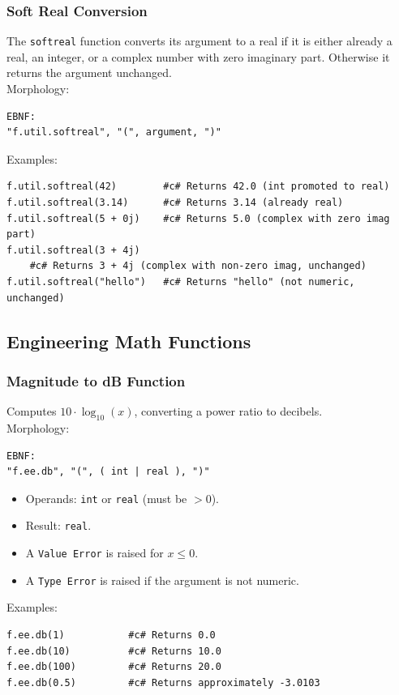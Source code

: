 \subsubsection{Soft Real Conversion}
The \texttt{softreal} function converts its argument to a real if it is either already a real, an integer, or a complex number with zero imaginary part. Otherwise it returns the argument unchanged. \\
Morphology:
\begin{verbatim}
EBNF:
"f.util.softreal", "(", argument, ")"
\end{verbatim}
Examples:
\begin{verbatim}
f.util.softreal(42)        #c# Returns 42.0 (int promoted to real)
f.util.softreal(3.14)      #c# Returns 3.14 (already real)
f.util.softreal(5 + 0j)    #c# Returns 5.0 (complex with zero imag part)
f.util.softreal(3 + 4j)
    #c# Returns 3 + 4j (complex with non-zero imag, unchanged)
f.util.softreal("hello")   #c# Returns "hello" (not numeric, unchanged)
\end{verbatim}

\subsection{Engineering Math Functions}

\subsubsection{Magnitude to dB Function}
Computes $10 \cdot \log_{10}(x)$, converting a power ratio to decibels. \\
Morphology:
\begin{verbatim}
EBNF:
"f.ee.db", "(", ( int | real ), ")"
\end{verbatim}
\begin{itemize}
\item Operands: \texttt{int} or \texttt{real} (must be $> 0$).
\item Result: \texttt{real}.
\item A \texttt{Value Error} is raised for $x \leq 0$.
\item A \texttt{Type Error} is raised if the argument is not numeric.
\end{itemize}
Examples:
\begin{verbatim}
f.ee.db(1)           #c# Returns 0.0
f.ee.db(10)          #c# Returns 10.0
f.ee.db(100)         #c# Returns 20.0
f.ee.db(0.5)         #c# Returns approximately -3.0103
\end{verbatim}

